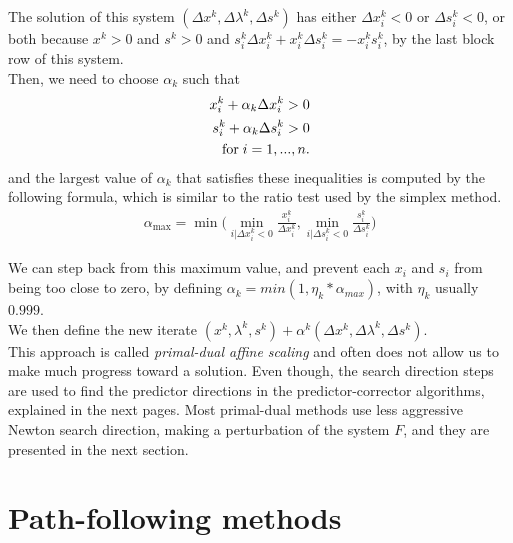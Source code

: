 \documentclass[a4paper,10 pt,titlepage,twoside]{book}
\theoremstyle{plain}
\theoremstyle{definition}
\theoremstyle{remark}
\begin{document}
The solution of this system $\left(\Delta x^{k},\Delta\lambda^{k},\Delta s^{k}\right)$ has either $\Delta x_{i}^{k}<0$ or $\Delta s_{i}^{k}<0$, or both because $x^{k}>0$ and $s^{k}>0$ and $s^{k}_{i}\Delta x^{k}_{i} + x^{k}_{i}\Delta s^{k}_{i} = - x^{k}_{i}s^{k}_{i}$, by the last block row of this system.\\
Then, we need to choose $\alpha_{k}$ such that
\begin{align*}
x^{k}_{i} + \alpha_{k} \Delta x^{k}_{i} >0 \\
s^{k}_{i} + \alpha_{k} \Delta s^{k}_{i} >0 \\	\text{for\;} i = 1,...,n.
\end{align*}
and the largest value of $\alpha_{k}$ that satisfies these inequalities is computed by the following formula, which is similar to the ratio test used by the simplex method. 
\begin{align*}
\alpha_{\max} = \min\bigg(\min_{i|\Delta x^{k}_{i}<0}\frac{x^{k}_{i}}{\Delta x^{k}_{i}}, \min_{i|\Delta s^{k}_{i}<0}\frac{s^{k}_{i}}{\Delta s^{k}_{i}}\bigg)
\end{align*} 

We can step back from this maximum value, and prevent each $x_{i}$ and $s_{i}$ from being too close to zero, by defining $\alpha_{k} = min\left(1,\eta_{k}*\alpha_{max}\right)$, with $\eta_{k}$ usually $0.999$.\\
We then define the new iterate $(x^{k},\lambda^{k},s^{k}) +\alpha^{k} (\Delta x^{k},\Delta \lambda^{k},\Delta s^{k})$.\\
This approach is called \textit{primal-dual affine scaling} and often does not allow us to make much progress toward a solution. Even though, the search direction steps are used to find the predictor directions in the predictor-corrector algorithms, explained in the next pages. 
Most primal-dual methods use less aggressive Newton search direction, making a perturbation of the system $F$, and they are presented in the next section.

\section{Path-following methods}
\end{document}

